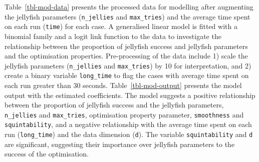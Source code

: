 \documentclass[
  number,
  preprint,
  3p]{elsarticle}
\begin{document}
Table~\ref{tbl-mod-data} presents the processed data for modelling after
augmenting the jellyfish parameters (\texttt{n\_jellies} and
\texttt{max\_tries}) and the average time spent on each run
(\texttt{time}) for each case. A generalised linear model is fitted with
a binomial family and a logit link function to the data to investigate
the relationship between the proportion of jellyfish success and
jellyfish parameters and the optimisation properties. Pre-processing of
the data include 1) scale the jellyfish parameters (\texttt{n\_jellies}
and \texttt{max\_tries}) by 10 for interpretation, and 2) create a
binary variable \texttt{long\_time} to flag the cases with average time
spent on each run greater than 30 seconds. Table~\ref{tbl-mod-output}
presents the model output with the estimated coefficients. The model
suggests a positive relationship between the proportion of jellyfish
success and the jellyfish parameters, \texttt{n\_jellies} and
\texttt{max\_tries}, optimisation property parameter,
\texttt{smoothness} and \texttt{squintability}, and a negative
relationship with the average time spent on each run
(\texttt{long\_time}) and the data dimension (\texttt{d}). The variable
\texttt{squintability} and \texttt{d} are significant, suggesting their
importance over jellyfish parameters to the success of the optimisation.

\begingroup\fontsize{7}{9}\selectfont
\end{document}
